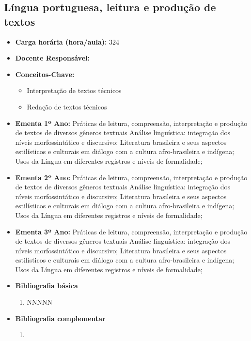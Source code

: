 \documentclass[11pt,fleqn]{book} %
\begin{document}
\subsection{Língua portuguesa, leitura e produção de textos}\label{disc:linguaportuguesa}
\begin{itemize}
	\item \textbf{Carga horária (hora/aula):} 324
	\item \textbf{Docente Responsável:}
	\item \textbf{Conceitos-Chave:}
	\begin{itemize}
		\item Interpretação de textos técnicos
		\item Redação de textos técnicos
	\end{itemize}
	\item \textbf{Ementa 1º Ano:} 
	Práticas de leitura, compreensão, interpretação e produção de textos de diversos gêneros textuais
	Análise linguística: integração dos níveis morfossintático e discursivo;
	Literatura brasileira e seus aspectos estilísticos e culturais em diálogo com a cultura afro-brasileira e indígena;
	Usos da Língua em diferentes registros e níveis de formalidade;

	\item \textbf{Ementa 2º Ano:} 
	Práticas de leitura, compreensão, interpretação e produção de textos de diversos gêneros textuais
	Análise linguística: integração dos níveis morfossintático e discursivo;
	Literatura brasileira e seus aspectos estilísticos e culturais em diálogo com a cultura afro-brasileira e indígena;
	Usos da Língua em diferentes registros e níveis de formalidade;

	\item \textbf{Ementa 3º Ano:} 
	Práticas de leitura, compreensão, interpretação e produção de textos de diversos gêneros textuais
	Análise linguística: integração dos níveis morfossintático e discursivo;
	Literatura brasileira e seus aspectos estilísticos e culturais em diálogo com a cultura afro-brasileira e indígena;
	Usos da Língua em diferentes registros e níveis de formalidade;	
	
	\item \textbf{Bibliografia básica}
	\begin{enumerate}
		\item NNNNN
	\end{enumerate}
	\item \textbf{Bibliografia complementar}
	\begin{enumerate}
		\item 
	\end{enumerate}	
\end{itemize}
\end{document}
